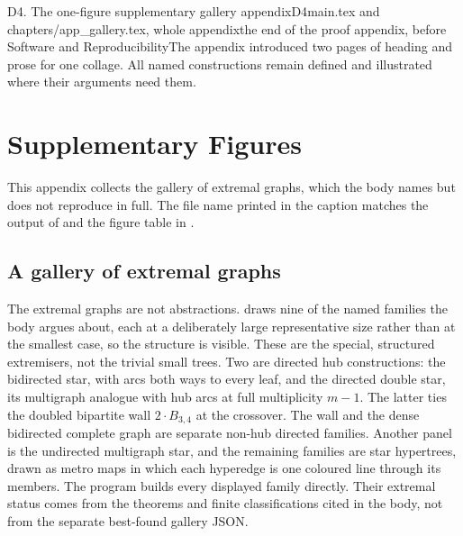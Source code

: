 \begin{offcut}{D4. The one-figure supplementary gallery appendix}{D4}{main.tex and chapters/app\_gallery.tex, whole appendix}{the end of the proof appendix, before Software and Reproducibility}{The appendix introduced two pages of heading and prose for one collage. All named constructions remain defined and illustrated where their arguments need them.}
\chapter{Supplementary Figures}\label{app:gallery}

This appendix collects the gallery of extremal graphs, which the body names but does not reproduce in full. The file name printed in the caption matches the output of  and the figure table in .

\section{A gallery of extremal graphs}\label{app:gallery-extremal}

The extremal graphs are not abstractions.  draws nine of the named families the body argues about, each at a deliberately large representative size rather than at the smallest case, so the structure is visible. These are the special, structured extremisers, not the trivial small trees. Two are directed hub constructions: the bidirected star, with arcs both ways to every leaf, and the directed double star, its multigraph analogue with hub arcs at full multiplicity $m-1$. The latter ties the doubled bipartite wall $2\cdot B_{3,4}$ at the crossover. The wall and the dense bidirected complete graph are separate non-hub directed families. Another panel is the undirected multigraph star, and the remaining families are star hypertrees, drawn as metro maps in which each hyperedge is one coloured line through its members. The program builds every displayed family directly. Their extremal status comes from the theorems and finite classifications cited in the body, not from the separate best-found gallery JSON.


\end{offcut}
